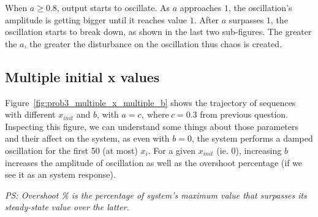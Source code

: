 When $a \ge 0.8$, output starts to oscillate. As $a$ approaches $1$, the oscillation's amplitude is getting bigger until it reaches value $1$.
After $a$ surpasses $1$, the oscillation starts to break down, as shown in the last two sub-figures. The greater the $a$, the greater the disturbance on the oscillation thus chaos is created.

\subsection{Multiple initial x values}

Figure~\ref{fig:prob3_multiple_x_multiple_b} shows the trajectory of sequences with different $x_{init}$ and $b$, with $a = c, \ \text{where} \ c = 0.3$ from previous question.
Inspecting this figure, we can understand some things about those parameters and their affect on the system, as even with $b=0$, the system performs a damped oscillation for the first 50 (at most) $x_i$.
For a given $x_{init}$ (ie. $0$), increasing $b$ increases the amplitude of oscillation as well as the overshoot percentage (if we see it as an system response).

\textit{\footnotesize PS: Overshoot \% is the percentage of system's maximum value that surpasses its steady-state value over the latter.}


